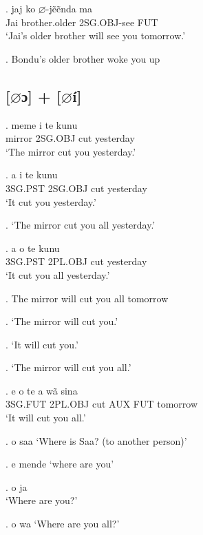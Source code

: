 \documentclass{assets/fieldnotes}
\begin{document}
\ex. jaj ko $\varnothing$-jẽẽnda ma \\
Jai brother.older 2SG.OBJ-see FUT \\
`Jai's older brother will see you tomorrow.'

\ex. Bondu's older brother woke you up


\subsection{[$\varnothing$ɔ] + [$\varnothing$í]}


\exg. meme i te kunu \\
mirror 2SG.OBJ cut yesterday \\
`The mirror cut you yesterday.'

\exg. a i te kunu \\
3SG.PST 2SG.OBJ cut yesterday \\
`It cut you yesterday.'


\ex. `The mirror cut you all yesterday.'

\ex. a o te kunu \\
3SG.PST 2PL.OBJ cut yesterday \\
`It cut you all yesterday.'

\ex. The mirror will cut you all tomorrow


\ex. `The mirror will cut you.'

\ex. `It will cut you.'

\ex. `The mirror will cut you all.'

\exg. e o te a wã sina \\
3SG.FUT 2PL.OBJ cut AUX FUT tomorrow \\
`It will cut you all.'

\ex. o saa
`Where is Saa? (to another person)' 


\exg. e mende
`where are you'

\ex. o ja \\
`Where are you?'


\ex. o wa
`Where are you all?'

\end{document}
